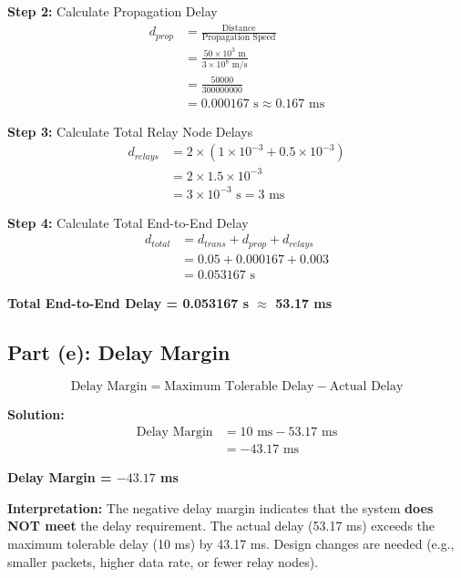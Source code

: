 \documentclass[12pt,a4paper]{article}
\begin{document}
\textbf{Step 2:} Calculate Propagation Delay
\begin{align*}
d_{prop} &= \frac{\text{Distance}}{\text{Propagation Speed}} \\[1em]
&= \frac{50 \times 10^3 \text{ m}}{3 \times 10^8 \text{ m/s}} \\[1em]
&= \frac{50000}{300000000} \\[1em]
&= 0.000167 \text{ s} \approx 0.167 \text{ ms}
\end{align*}

\textbf{Step 3:} Calculate Total Relay Node Delays
\begin{align*}
d_{relays} &= 2 \times (1 \times 10^{-3} + 0.5 \times 10^{-3}) \\[1em]
&= 2 \times 1.5 \times 10^{-3} \\[1em]
&= 3 \times 10^{-3} \text{ s} = 3 \text{ ms}
\end{align*}

\textbf{Step 4:} Calculate Total End-to-End Delay
\begin{align*}
d_{total} &= d_{trans} + d_{prop} + d_{relays} \\[1em]
&= 0.05 + 0.000167 + 0.003 \\[1em]
&= 0.053167 \text{ s}
\end{align*}

\begin{answerbox}
\textbf{Total End-to-End Delay = 0.053167 s $\approx$ 53.17 ms}
\end{answerbox}

\subsection{Part (e): Delay Margin}

\begin{formulabox}
\[\text{Delay Margin} = \text{Maximum Tolerable Delay} - \text{Actual Delay}\]
\end{formulabox}

\textbf{Solution:}
\begin{align*}
\text{Delay Margin} &= 10 \text{ ms} - 53.17 \text{ ms} \\[1em]
&= -43.17 \text{ ms}
\end{align*}

\begin{answerbox}
\textbf{Delay Margin = $-43.17$ ms}

\vspace{0.5em}
\textbf{Interpretation:} The negative delay margin indicates that the system \textbf{does NOT meet} the delay requirement. The actual delay (53.17 ms) exceeds the maximum tolerable delay (10 ms) by 43.17 ms. Design changes are needed (e.g., smaller packets, higher data rate, or fewer relay nodes).
\end{answerbox}
\end{document}
